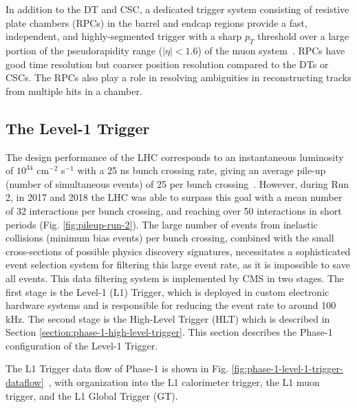 In addition to the DT and CSC, a dedicated trigger system consisting of resistive plate chambers (RPCs) in the barrel and endcap regions provide a fast, independent, and highly-segmented trigger with a sharp $p_T$ threshold over a large portion of the pseudorapidity range ($|\eta| < 1.6$) of the muon system~\cite{CMS-2008-JINST-3-S08004}. RPCs have good time resolution but coarser position resolution compared to the DTs or CSCs. The RPCs also play a role in resolving ambiguities in reconstructing tracks from multiple hits in a chamber. 

\subsection{The Level-1 Trigger}
\label{section:phase-1-l1-trigger}
The design performance of the LHC corresponds to an instantaneous luminosity of $10^{34}$ cm$^{-2}$ s$^{-1}$ with a 25 ns bunch crossing rate, giving an average pile-up (number of simultaneous events) of 25 per bunch crossing~\cite{CMS-TDR-012}. However, during Run 2, in 2017 and 2018 the LHC was able to surpass this goal with a mean number of 32 interactions per bunch crossing, and reaching over 50 interactions in short periods (Fig. \ref{fig:pileup-run-2}). The large number of events from inelastic collisions (minimum bias events) per bunch crossing, combined with the small cross-sections of possible physics discovery signatures, necessitates a sophisticated event selection system for filtering this large event rate, as it is impossible to save all events. This data filtering system is implemented by CMS in two stages. The first stage is the Level-1 (L1) Trigger, which is deployed in custom electronic hardware systems and is responsible for reducing the event rate to around 100 kHz. The second stage is the High-Level Trigger (HLT) which is described in Section \ref{section:phase-1-high-level-trigger}. This section describes the Phase-1 configuration of the Level-1 Trigger.

The L1 Trigger data flow of Phase-1 is shown in Fig. \ref{fig:phase-1-level-1-trigger-dataflow}~\cite{CMS-TDR-012}, with organization into the L1 calorimeter trigger, the L1 muon trigger, and the L1 Global Trigger (GT). 

